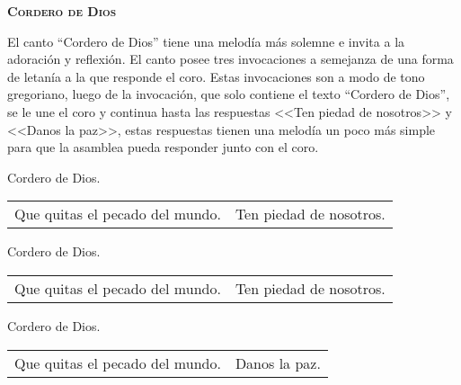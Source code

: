 \documentclass[12pt, letterpaper]{report}
\begin{document}


    \begin{center}
        {\scshape \Huge {\bfseries Cordero de Dios}}
    \end{center}

    \Large El canto ``Cordero de Dios'' tiene una melod\'ia m\'as solemne e invita a la adoraci\'on y
    reflexi\'on. El canto posee tres invocaciones a semejanza de una forma de letan\'ia a la que
    responde el coro. Estas invocaciones son a modo de tono gregoriano, luego de la invocaci\'on,
    que solo contiene el texto ``Cordero de Dios'', se le une el coro y continua hasta las respuestas
    <<Ten piedad de nosotros>> y <<Danos la paz>>, estas respuestas tienen una melod\'ia un poco
    m\'as simple para que la asamblea pueda responder junto con el coro.

    \noindent
    \LARGE Cordero de Dios.\\
    \LARGE \begin{tabular}{ll}
        Que quitas el pecado del mundo.& Ten piedad de nosotros.
    \end{tabular}

    \noindent
    \LARGE Cordero de Dios.\\
    \LARGE \begin{tabular}{ll}
        Que quitas el pecado del mundo.& Ten piedad de nosotros.
    \end{tabular}

    \noindent
    \LARGE Cordero de Dios.\\
    \LARGE \begin{tabular}{ll}
        Que quitas el pecado del mundo.& Danos la paz.
    \end{tabular}
    \clearpage


\end{document}
